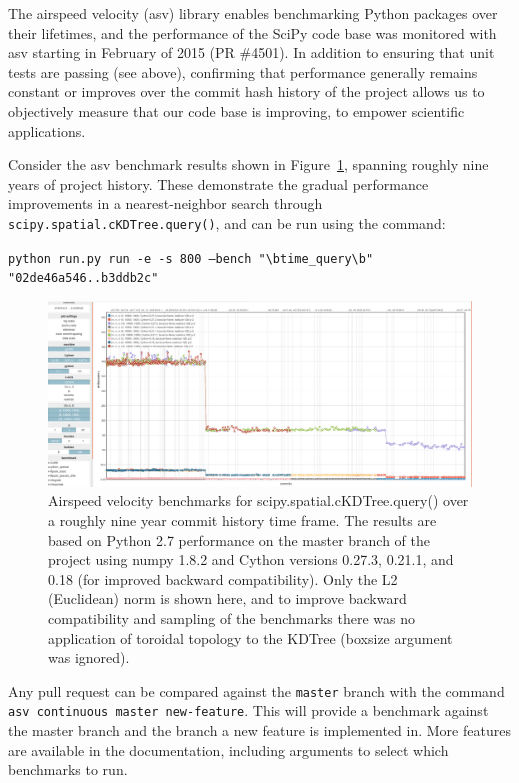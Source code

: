 \documentclass[fleqn,10pt]{wlscirep}
\begin{document}
    The airspeed velocity (asv) library enables benchmarking Python packages over their lifetimes, and the performance of the SciPy
    code base was monitored with asv starting in February of 2015 (PR \#4501). In addition to ensuring that unit tests are passing (see above),
    confirming that performance generally remains constant or improves over the commit hash history of the project allows us to objectively
    measure that our code base is improving, to empower scientific applications.

    Consider the asv benchmark results shown in Figure~\ref{fig:asvbench}, spanning roughly nine years of project history. These demonstrate the gradual performance
    improvements in a nearest-neighbor search through \texttt{scipy.spatial.cKDTree.query()}, and can be run using the command:


    \texttt{python run.py run -e -s 800 --bench "\textbackslash btime\_query\textbackslash b" "02de46a546..b3ddb2c"}

    \begin{figure}[H]
        \centering
        \includegraphics[width=\textwidth]{static/asv_time_query_ckdtree}
        \caption{Airspeed velocity benchmarks for scipy.spatial.cKDTree.query() over a roughly nine year commit history time frame. The results are based on Python 2.7 performance on the master branch of the project using numpy 1.8.2 and Cython versions 0.27.3, 0.21.1, and 0.18 (for improved backward compatibility). Only the L2 (Euclidean) norm is shown here, and to improve backward compatibility and sampling of the benchmarks there was no application of toroidal topology to the KDTree (boxsize argument was ignored).}
        \label{fig:asvbench}
    \end{figure}

   Any pull request can be compared against the \texttt{master} branch with the command \texttt{asv continuous master new-feature}. This will provide a benchmark against the master branch and the branch a new feature is implemented in. More features are available in the documentation, including arguments to select which benchmarks to run.
\end{document}
